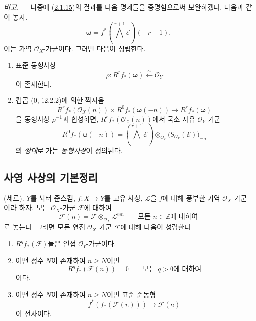 \begin{env}[2.1.16]
\label{III.2.1.16-fr}
\emph{비고.} --- 나중에 (\hyperref[III.2.1.15-fr]{2.1.15})의 결과를
다음 명제들을 증명함으로써 보완하겠다. 다음과 같이 놓자.
\[
\boldsymbol\omega=f^*\left(\bigwedge^{r+1}\mathcal E\right)(-r-1).
\]
이는 가역 $\mathcal O_X$-가군이다. 그러면 다음이 성립한다.
\begin{enumerate}
\item[{\rm(i)}] 표준 동형사상
\begin{equation}
\label{III.2.1.16.1-fr}
\tag{2.1.16.1}
\rho:R^rf_*(\boldsymbol\omega)\xleftarrow{\sim}\mathcal O_Y
\end{equation}
이 존재한다.
\item[{\rm(ii)}] 컵곱 (0, 12.2.2)에 의한 짝지음
\begin{equation}
\label{III.2.1.16.2-fr}
\tag{2.1.16.2}
R^rf_*(\mathcal O_X(n))\times R^0f_*(\boldsymbol\omega(-n))
\longrightarrow R^rf_*(\boldsymbol\omega)
\end{equation}
을 동형사상 $\rho^{-1}$과 합성하면,
$R^rf_*(\mathcal O_X(n))$에서 국소 자유 $\mathcal O_Y$-가군
\[
R^0f_*(\boldsymbol\omega(-n))
=\left(\bigwedge^{r+1}\mathcal E\right)
\otimes_{\mathcal O_Y}\bigl(S_{\mathcal O_Y}(\mathcal E)\bigr)_{-n}
\]
의 \emph{쌍대}로 가는 \emph{동형사상}이 정의된다.
\end{enumerate}
\end{env}

\subsection{사영 사상의 기본정리}
\label{subsection:III.2.2-fr}

\begin{theorem}[2.2.1]
\label{III.2.2.1-fr}
(세르). $Y$를 뇌터 준스킴, $f:X\to Y$를 고유 사상,
$\mathcal L$을 $f$에 대해 풍부한 가역 $\mathcal O_X$-가군이라 하자.
모든 $\mathcal O_X$-가군 $\mathcal F$에 대하여
\[
\mathcal F(n)=\mathcal F\otimes_{\mathcal O_X}\mathcal L^{\otimes n}
\qquad\text{모든 }n\in\mathbb Z\text{에 대하여}
\]
로 놓는다. 그러면 모든 연접 $\mathcal O_X$-가군 $\mathcal F$에 대해
다음이 성립한다.
\begin{enumerate}
\item[{\rm(i)}] $R^qf_*(\mathcal F)$들은 연접 $\mathcal O_Y$-가군이다.
\item[{\rm(ii)}] 어떤 정수 $N$이 존재하여 $n\geq N$이면
\[
R^qf_*(\mathcal F(n))=0\qquad\text{모든 }q>0\text{에 대하여}
\]
이다.
\item[{\rm(iii)}] 어떤 정수 $N$이 존재하여 $n\geq N$이면 표준 준동형
\[
f^*(f_*(\mathcal F(n)))\longrightarrow\mathcal F(n)
\]
이 전사이다.
\end{enumerate}
\end{theorem}

